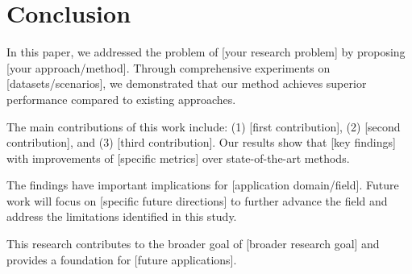 \section{Conclusion}
\label{sec:conclusion}


In this paper, we addressed the problem of [your research problem] by proposing [your approach/method]. Through comprehensive experiments on [datasets/scenarios], we demonstrated that our method achieves superior performance compared to existing approaches.

The main contributions of this work include: (1) [first contribution], (2) [second contribution], and (3) [third contribution]. Our results show that [key findings] with improvements of [specific metrics] over state-of-the-art methods.

The findings have important implications for [application domain/field]. Future work will focus on [specific future directions] to further advance the field and address the limitations identified in this study.

This research contributes to the broader goal of [broader research goal] and provides a foundation for [future applications].